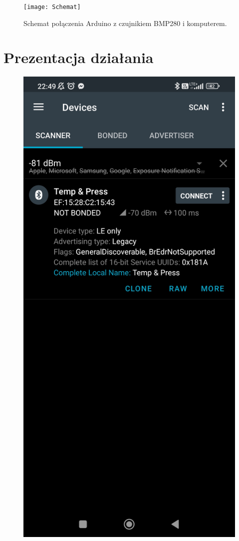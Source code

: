 \documentclass[11pt]{article} %
\begin{document}
\begin{figure}[H]
\centering
\texttt{[image: Schemat]}
\caption{Schemat połączenia Arduino z czujnikiem BMP280 i komputerem.}
\end{figure}

\section{Prezentacja działania}

\begin{figure}[H]
\centering
\begin{minipage}[H]{0.4\textwidth}
\centering
\includegraphics[scale=0.1]{nRFconnect_1}

\end{minipage}
\end{figure}
\end{document}
